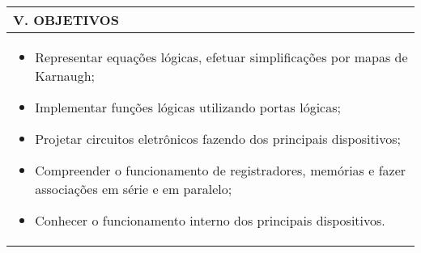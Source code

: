 \documentclass[12pt]{article}
\begin{document}
\begin{longtable}{|L{1.025\textwidth}|} \hline
%
{\bf V. OBJETIVOS } \\ \hline
%
\begin{itemize}
\item Representar equações lógicas, efetuar simplificações por mapas de Karnaugh;
\item Implementar funções lógicas utilizando portas lógicas;
\item Projetar circuitos eletrônicos fazendo dos principais dispositivos;
\item Compreender o funcionamento de registradores, memórias e fazer associações em série e em paralelo;
\item Conhecer o funcionamento interno dos principais dispositivos.
\end{itemize}

\\ \hline
\end{longtable}
\end{document}
